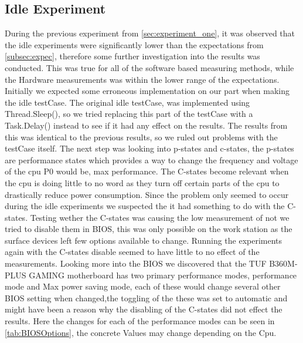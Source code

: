 \subsection{Idle Experiment}
During the previous experiment from \cref{sec:experiment_one}, it was observed that the idle experiments were significantly lower than the expectations from \cref{subsec:expec}, therefore some further investigation into the results was conducted. This was true for all of the software based measuring methods, while the Hardware measurements was within the lower range of the expectations. Initially we expected some erroneous implementation on our part when making the idle testCase. The original idle testCase, was implemented using Thread.Sleep(), so we tried replacing this part of the testCase with a Task.Delay() instead to see if it had any effect on the results. The results from this was identical to the previous results, so we ruled out problems with the testCase itself. The next step was looking into p-states and c-states\cite[]{PCStat}, the p-states are performance states which provides a way to change the frequency and voltage of the cpu P0 would be, max performance. The C-states become relevant when the cpu is doing little to no word as they turn off certain parts of the cpu to drastically reduce power consumption. Since the problem only seemed to occur during the idle experiments we suspected the it had something to do with the C-states. Testing wether the C-states was causing the low measurement of not we tried to disable them in BIOS, this was only possible on the work station as the surface devices left few options available to change. Running the experiments again with the C-states disable seemed to have little to no effect of the measurements. Looking more into the BIOS we discovered that the TUF B360M-PLUS GAMING motherboard has two primary performance modes, performance mode and Max power saving mode, each of these would change several other BIOS setting when changed,the toggling of the these was set to automatic and might have been a reason why the disabling of the C-states did not effect the results. Here the changes for each of the performance modes can be seen in \cref{tab:BIOSOptions}, the concrete Values may change depending on the Cpu.

